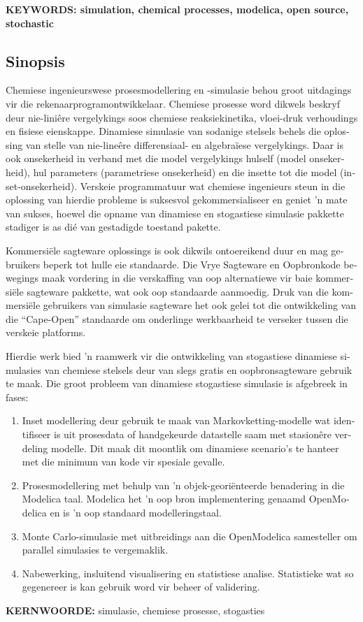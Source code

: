 \noindent \textbf{KEYWORDS: simulation, chemical processes, modelica, open source, stochastic} 

\begin{otherlanguage}{afrikaans}
\chapter*{Sinopsis}
Chemiese ingenieurswese prosesmodellering en -simulasie behou groot uitdagings vir die rekenaarprogramontwikkelaar. 
Chemiese prosesse word dikwels beskryf deur nie-lini\^ere vergelykings soos chemiese reaksiekinetika, vloei-druk verhoudings en fisiese eienskappe. 
Dinamiese simulasie van sodanige stelsels behels die oplossing van stelle van nie-line\^ere differensiaal- en algebra\"iese vergelykings. 
Daar is ook onsekerheid in verband met die model vergelykings hulself (model onsekerheid), hul parameters (parametriese onsekerheid) en die insette tot die model (inset-onsekerheid). 
Verskeie programmatuur wat chemiese ingenieurs steun in die oplossing van hierdie probleme is suksesvol gekommersialiseer en geniet 'n mate van sukses, hoewel die opname van dinamiese en stogastiese simulasie pakkette stadiger is as di\'e van gestadigde toestand pakette.

Kommersi\"ele sagteware oplossings is ook dikwils ontoereikend duur en mag gebruikers beperk tot hulle eie standaarde. 
Die Vrye Sagteware en Oopbronkode bewegings maak vordering in die verskaffing van oop alternatiewe vir baie kommersi\"ele sagteware pakkette, wat ook oop standaarde aanmoedig.
Druk van die kommersi\"ele gebruikers van simulasie sagteware het ook gelei tot die ontwikkeling van die ``Cape-Open'' standaarde om onderlinge werkbaarheid te verseker tussen die verskeie platforms. 

Hierdie werk bied 'n raamwerk vir die ontwikkeling van stogastiese dinamiese simulasies van chemiese stelsels deur van slegs gratis en oopbronsagteware gebruik te maak. 
Die groot probleem van dinamiese stogastiese simulasie is afgebreek in fases:
\begin{enumerate}
\item Inset modellering deur gebruik te maak van Markovketting-modelle wat identifiseer is uit prosesdata of handgekeurde datastelle saam met stasion\^ere verdeling modelle.
  Dit maak dit moontlik om dinamiese scenario's te hanteer met die minimum van kode vir spesiale gevalle.
\item Prosesmodellering met behulp van 'n objek-geori\"enteerde benadering in die Modelica taal.
  Modelica het 'n oop bron implementering genaamd OpenModelica en is 'n oop standaard modelleringstaal.
\item Monte Carlo-simulasie met uitbreidings aan die OpenModelica samesteller om parallel simulasies te vergemaklik.
\item Nabewerking, insluitend visualisering en statistiese analise.
  Statistieke wat so gegenereer is kan gebruik word vir beheer of validering.
\end{enumerate}

\bigskip 

\noindent \textbf{KERNWOORDE:} simulasie, chemiese prosesse, stogasties

\end{otherlanguage} 


